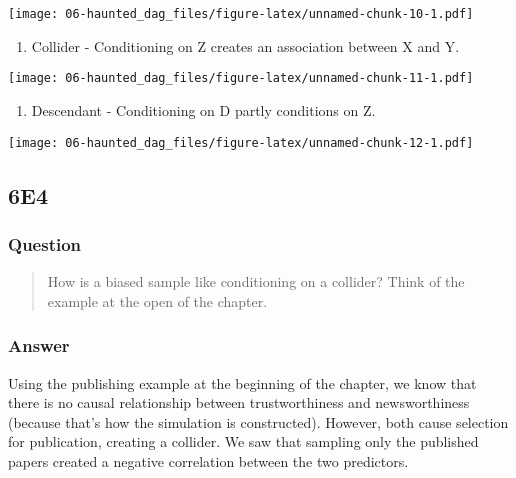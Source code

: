 \documentclass[
]{book}
\providecommand{\tightlist}{%
  \setlength{\itemsep}{0pt}\setlength{\parskip}{0pt}}
\begin{document}
\texttt{[image: 06-haunted\_dag\_files/figure-latex/unnamed-chunk-10-1.pdf]}

\begin{enumerate}
\def\labelenumi{\arabic{enumi}.}
\setcounter{enumi}{2}
\tightlist
\item
  Collider - Conditioning on Z creates an association between X and Y.
\end{enumerate}

\texttt{[image: 06-haunted\_dag\_files/figure-latex/unnamed-chunk-11-1.pdf]}

\begin{enumerate}
\def\labelenumi{\arabic{enumi}.}
\setcounter{enumi}{3}
\tightlist
\item
  Descendant - Conditioning on D partly conditions on Z.
\end{enumerate}

\texttt{[image: 06-haunted\_dag\_files/figure-latex/unnamed-chunk-12-1.pdf]}

\hypertarget{e4-4}{%
\subsection*{6E4}\label{e4-4}}

\hypertarget{question-51}{%
\subsubsection*{Question}\label{question-51}}

\begin{quote}
How is a biased sample like conditioning on a collider? Think of the example at the open of the chapter.
\end{quote}

\hypertarget{answer-51}{%
\subsubsection*{Answer}\label{answer-51}}

Using the publishing example at the beginning of the chapter, we know that there is no causal relationship between trustworthiness and newsworthiness (because that's how the simulation is constructed). However, both cause selection for publication, creating a collider. We saw that sampling only the published papers created a negative correlation between the two predictors.
\end{document}
